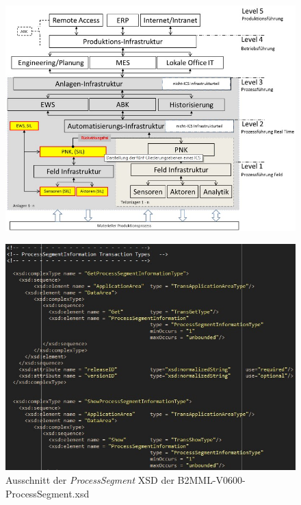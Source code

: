 \begin{figure}[ph!]
\centering
\includegraphics[width=1\textwidth]{Bilder/Hierarchische_Gliederung_eines_ICS_gemäß_ICS-Kompendium.jpg}
\vspace{0em}
\label{fig:Hierarchische_Gliederung_gem_ICS}
\end{figure}

\begin{figure}[ph!]
\centering 
\includegraphics[width=1\textwidth]{Bilder/processsegmentinformationtype.jpg}
\caption[]{Ausschnitt der \textit{ProcessSegment} XSD der B2MML-V0600-ProcessSegment.xsd}
\label{fig:processsegment}
\end{figure}


